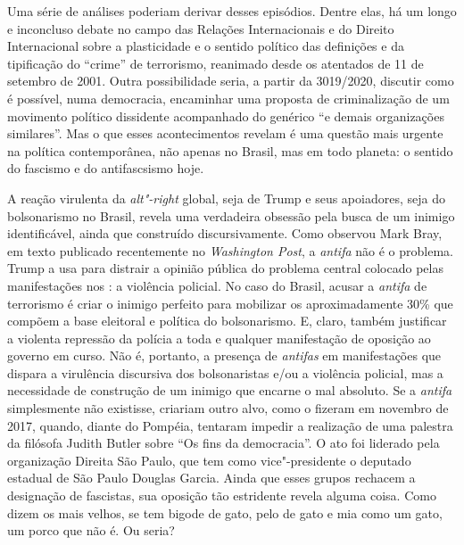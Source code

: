 Uma série de análises poderiam derivar desses episódios. Dentre elas, há
um longo e inconcluso debate no campo das Relações Internacionais e do
Direito Internacional sobre a plasticidade e o sentido político das
definições e da tipificação do ``crime'' de terrorismo, reanimado desde
os atentados de 11 de setembro de 2001. Outra possibilidade seria, a
partir da  3019/2020, discutir como é possível, numa democracia,
encaminhar uma proposta de criminalização de um movimento político
dissidente acompanhado do genérico ``e demais organizações similares''.
Mas o que esses acontecimentos revelam é uma questão mais urgente na
política contemporânea, não apenas no Brasil, mas em todo planeta: o
sentido do fascismo e do antifascsismo hoje.

A reação virulenta da \emph{alt"-right} global, seja de Trump e seus
apoiadores, seja do bolsonarismo no Brasil, revela uma verdadeira
obsessão pela busca de um inimigo identificável, ainda que construído
discursivamente. Como observou Mark Bray, em texto publicado
recentemente no \emph{Washington Post}, a \emph{antifa} não é o
problema. Trump a usa para distrair a opinião pública do problema
central colocado pelas manifestações nos : a violência policial. No
caso do Brasil, acusar a \emph{antifa} de terrorismo é criar o inimigo
perfeito para mobilizar os aproximadamente 30\% que compõem a base
eleitoral e política do bolsonarismo. E, claro, também justificar a
violenta repressão da polícia a toda e qualquer manifestação de oposição
ao governo em curso. Não é, portanto, a presença de \emph{antifas} em
manifestações que dispara a virulência discursiva dos bolsonaristas e/ou
a violência policial, mas a necessidade de construção de um inimigo que
encarne o mal absoluto. Se a \emph{antifa} simplesmente não existisse,
criariam outro alvo, como o fizeram em novembro de 2017, quando, diante
do  Pompéia, tentaram impedir a realização de uma palestra da
filósofa Judith Butler sobre ``Os fins da democracia''. O ato foi
liderado pela organização Direita São Paulo, que tem como
vice"-presidente o deputado estadual de São Paulo Douglas Garcia. Ainda
que esses grupos rechacem a designação de fascistas, sua oposição tão
estridente revela alguma coisa. Como dizem os mais velhos, se tem bigode
de gato, pelo de gato e mia como um gato, um porco que não é. Ou seria?

